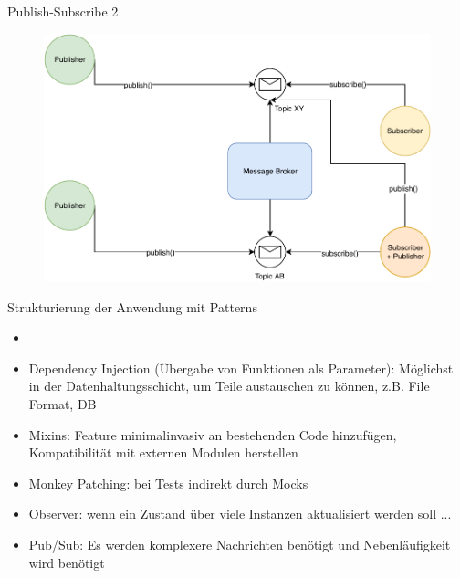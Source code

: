 \begin{frame}{Publish-Subscribe 2}
      \begin{figure}[!htb]
        \includegraphics[scale=0.67]{img/pubsub}
    \end{figure}

\end{frame}


\begin{frame}{Strukturierung der Anwendung mit Patterns}
      \begin{itemize}
        \setlength{\itemindent}{1.5in}
        \item [\textbf{Einsatz der Patterns}]
    \end{itemize}

    \begin{itemize}
        \item Dependency Injection (Übergabe von Funktionen als Parameter): Möglichst in der Datenhaltungsschicht, um Teile austauschen zu können, z.B. File Format, DB
        \item Mixins: Feature minimalinvasiv an bestehenden Code hinzufügen, Kompatibilität mit externen Modulen herstellen
        \item Monkey Patching:  bei Tests indirekt durch Mocks
        \item Observer:  wenn ein Zustand über viele Instanzen aktualisiert werden soll ...
        \item Pub/Sub:  Es werden komplexere Nachrichten benötigt und Nebenläufigkeit  wird benötigt
    \end{itemize}

\end{frame}



